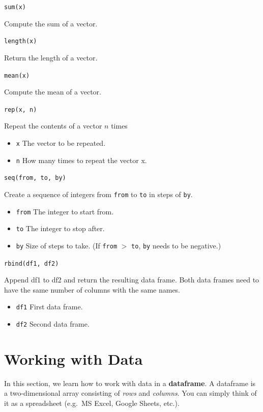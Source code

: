 \documentclass[
]{book}
\providecommand{\tightlist}{%
  \setlength{\itemsep}{0pt}\setlength{\parskip}{0pt}}
\begin{document}
\texttt{sum(x)}

Compute the sum of a vector.

\texttt{length(x)}

Return the length of a vector.

\texttt{mean(x)}

Compute the mean of a vector.

\texttt{rep(x,\ n)}

Repeat the contents of a vector \(n\) times

\begin{itemize}
\tightlist
\item
  \texttt{x} The vector to be repeated.
\item
  \texttt{n} How many times to repeat the vector x.
\end{itemize}

\texttt{seq(from,\ to,\ by)}

Create a sequence of integers from \texttt{from} to \texttt{to} in steps of \texttt{by}.

\begin{itemize}
\tightlist
\item
  \texttt{from} The integer to start from.
\item
  \texttt{to} The integer to stop after.
\item
  \texttt{by} Size of steps to take. (If \texttt{from} \(>\) \texttt{to}, \texttt{by} needs to be negative.)
\end{itemize}

\texttt{rbind(df1,\ df2)}

Append df1 to df2 and return the resulting data frame. Both data frames need to have the same number of columns with the same names.

\begin{itemize}
\tightlist
\item
  \texttt{df1} First data frame.
\item
  \texttt{df2} Second data frame.
\end{itemize}

\chapter{Working with Data}\label{working-with-data}

In this section, we learn how to work with data in a \textbf{dataframe}. A dataframe is a two-dimensional array consisting of \emph{rows} and \emph{columns}. You can simply think of it as a spreadsheet (e.g.~MS Excel, Google Sheets, etc.).
\end{document}
